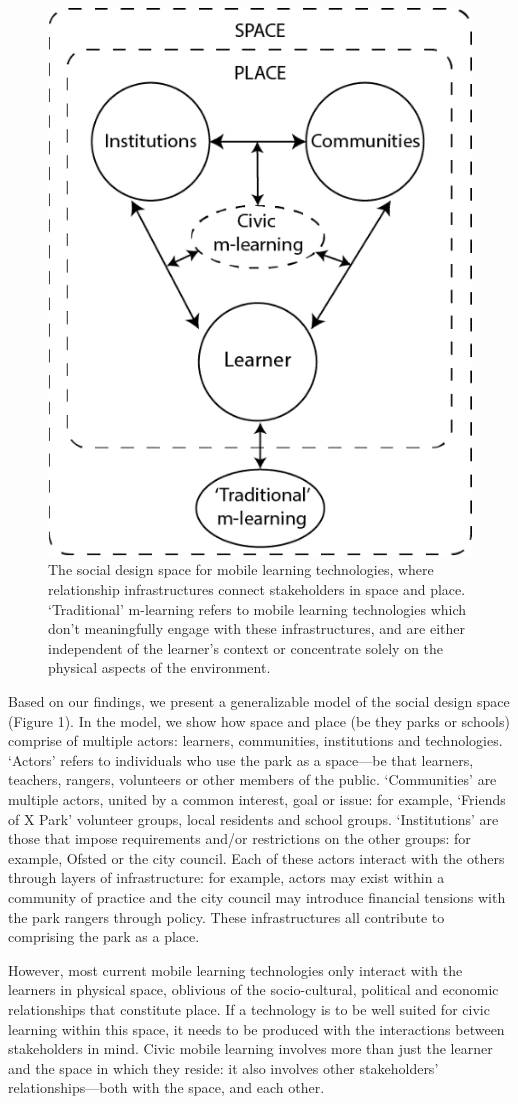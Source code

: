 \begin{figure}
  \centering
  \includegraphics[width=0.45\columnwidth]{images/chapter04/designSpace.png}
  \caption{The social design space for mobile learning technologies, where relationship infrastructures connect stakeholders in space and place. `Traditional' m-learning refers to mobile learning technologies which don’t meaningfully engage with these infrastructures, and are either independent of the learner’s context or concentrate solely on the physical aspects of the environment.}
  \label{fig:designSpace}
\end{figure}

Based on our findings, we present a generalizable model of the social design space (Figure 1). In the model, we show how space and place (be they parks or schools) comprise of multiple actors: learners, communities, institutions and technologies. `Actors' refers to individuals who use the park as a space—be that learners, teachers, rangers, volunteers or other members of the public. `Communities' are multiple actors, united by a common interest, goal or issue: for example, ‘Friends of X Park’ volunteer groups, local residents and school groups. `Institutions' are those that impose requirements and/or restrictions on the other groups: for example, Ofsted or the city council. Each of these actors interact with the others through layers of infrastructure: for example, actors may exist within a community of practice and the city council may introduce financial tensions with the park rangers through policy. These infrastructures all contribute to comprising the park as a place.

However, most current mobile learning technologies only interact with the learners in physical space, oblivious of the socio-cultural, political and economic relationships that constitute place. If a technology is to be well suited for civic learning within this space, it needs to be produced with the interactions between stakeholders in mind. Civic mobile learning involves more than just the learner and the space in which they reside: it also involves other stakeholders' relationships---both with the space, and each other.

